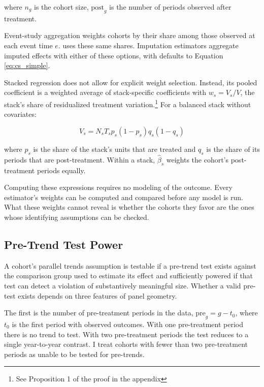 \documentclass[12pt]{article}
\begin{document}
where $n_g$ is the cohort size, $\text{post}_g$ is the number of periods observed after treatment.

Event-study aggregation weights cohorts by their share among those observed at each event time $e$. \textcite{sun2021estimating} uses these same shares. Imputation estimators aggregate imputed effects with either of these options, with defaults to Equation \ref{eq:cs_simple}.

Stacked regression does not allow for explicit weight selection. Instead, its pooled coefficient is a weighted average of stack-specific coefficients with $w_s = V_s / V$, the stack's share of residualized treatment variation.\footnote{See Proposition 1 of the proof in the appendix} For a balanced stack without covariates:

\begin{equation}\label{eq:stacked_weights}
    V_s = N_s T_s p_s(1-p_s)q_s(1-q_s)
\end{equation}

where $p_s$ is the share of the stack's units that are treated and $q_s$ is the share of its periods that are post-treatment. Within a stack, $\hat{\beta}_s$ weights the cohort's post-treatment periods equally.

Computing these expressions requires no modeling of the outcome. Every estimator's weights can be computed and compared before any model is run. What these weights cannot reveal is whether the cohorts they favor are the ones whose identifying assumptions can be checked.

\subsection{Pre-Trend Test Power}       %

A cohort's parallel trends assumption is testable if a pre-trend test exists against the comparison group used to estimate its effect and sufficiently powered if that test can detect a violation of substantively meaningful size. Whether a valid pre-test exists depends on three features of panel geometry.

The first is the number of pre-treatment periods in the data, $\text{pre}_g = g - t_0$, where $t_0$ is the first period with observed outcomes. With one pre-treatment period there is no trend to test. With two pre-treatment periods the test reduces to a single year-to-year contrast. I treat cohorts with fewer than two pre-treatment periods as unable to be tested for pre-trends.
\end{document}
